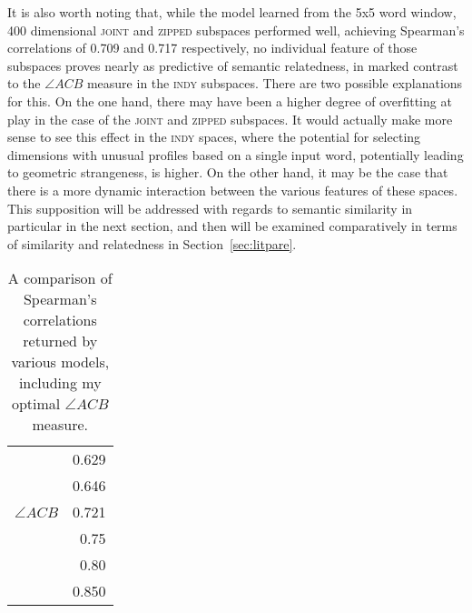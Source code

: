 It is also worth noting that, while the model learned from the 5x5 word window, 400 dimensional \textsc{joint} and \textsc{zipped} subspaces performed well, achieving Spearman's correlations of 0.709 and 0.717 respectively, no individual feature of those subspaces proves nearly as predictive of semantic relatedness, in marked contrast to the $\angle ACB$ measure in the \textsc{indy} subspaces.  There are two possible explanations for this.  On the one hand, there may have been a higher degree of overfitting at play in the case of the \textsc{joint} and \textsc{zipped} subspaces.  It would actually make more sense to see this effect in the \textsc{indy} spaces, where the potential for selecting dimensions with unusual profiles based on a single input word, potentially leading to geometric strangeness, is higher.  On the other hand, it may be the case that there is a more dynamic interaction between the various features of these spaces.  This supposition will be addressed with regards to semantic similarity in particular in the next section, and then will be examined comparatively in terms of similarity and relatedness in Section~\ref{sec:litpare}.

\begin{table}
\centering
\begin{tabular}{lr}
\hline
\cite{HassanEA2011} & 0.629 \\
\cite{LuongEA2013} & 0.646 \\
$\angle ACB$ & 0.721 \\
\cite{GabrilovichEA2007} & 0.75 \\
\cite{RadinskyEA2011} & 0.80 \\
\cite{HalawiEA2012} & 0.850 \\
\hline
\end{tabular}
\caption[Comparison of Relatedness Scores]{A comparison of Spearman's correlations returned by various models, including my optimal $\angle ACB$ measure.}
\label{tab:relpare}
\end{table}


